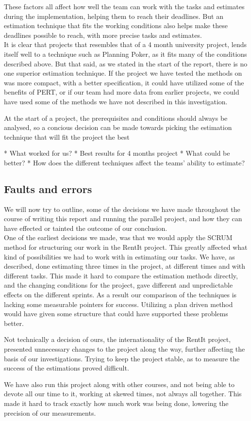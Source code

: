 These factors all affect how well the team can work with the tasks and estimates during the implementation, helping them to reach their deadlines. But an estimation technique that fits the working conditions also helps make these deadlines possible to reach, with more precise tasks and estimates.\\

It is clear that projects that resembles that of a 4 month university project, lends itself well to a technique such as Planning Poker, as it fits many of the conditions described above. But that said, as we stated in the start of the report, there is no one superior estimation technique. If the project we have tested the methods on was more compact, with a better specification, it could have utilized some of the benefits of PERT, or if our team had more data from earlier projects, we could have used some of the methods we have not described in this investigation. 

At the start of a project, the prerequisites and conditions should always be analysed, so a concious decision can be made towards picking the estimation technique that will fit the project the best


* What worked for us?
* Best results for 4 months project
* What could be better?
* How does the different techniques affect the teams' ability to estimate?

\subsection{Faults and errors}
We will now try to outline, some of the decisions we have made throughout the course of writing this report and running the parallel project, and how they can have effected or tainted the outcome of our conclusion.\\

One of the earliest decisions we made, was that we would apply the SCRUM method for structuring our work in the RentIt project. This greatly affected what kind of possibilities we had to work with in estimating our tasks. We have, as described, done estimating three times in the project, at different times and with different tasks. This made it hard to compare the estimation methods directly, and the changing conditions for the project, gave different and unpredictable effects on the different sprints. As a result our comparison of the techniques is lacking some measurable pointers for success. Utilizing a plan driven method would have given some structure that could have supported these problems better.

Not technically a decision of ours, the internationality of the RentIt project, presented unnecessary changes to the project along the way, further affecting the basis of our investigations. Trying to keep the project stable, as to measure the success of the estimations proved difficult.

We have also run this project along with other courses, and not being able to devote all our time to it, working at skewed times, not always all together. This made it hard to track exactly how much work was being done, lowering the precision of our measurements.



